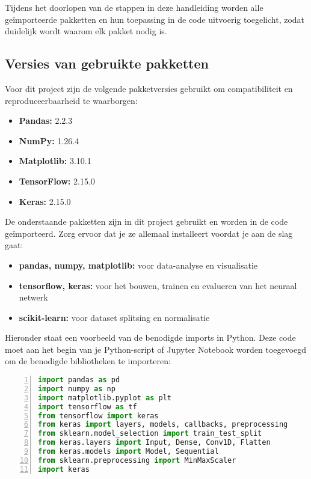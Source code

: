 Tijdens het doorlopen van de stappen in deze handleiding worden alle geïmporteerde pakketten en hun toepassing in de code uitvoerig toegelicht, zodat duidelijk wordt waarom elk pakket nodig is.
\subsection*{Versies van gebruikte pakketten}
Voor dit project zijn de volgende pakketversies gebruikt om compatibiliteit en reproduceerbaarheid te waarborgen:
\begin{itemize}
  \item \textbf{Pandas:} 2.2.3
  \item \textbf{NumPy:} 1.26.4
  \item \textbf{Matplotlib:} 3.10.1
  \item \textbf{TensorFlow:} 2.15.0
  \item \textbf{Keras:} 2.15.0
\end{itemize}

De onderstaande pakketten zijn in dit project gebruikt en worden in de code geïmporteerd. Zorg ervoor dat je ze allemaal installeert voordat je aan de slag gaat:
\begin{itemize}
  \item \textbf{pandas, numpy, matplotlib:} voor data-analyse en visualisatie
  \item \textbf{tensorflow, keras:} voor het bouwen, trainen en evalueren van het neuraal netwerk
  \item \textbf{scikit-learn:} voor dataset splitsing en normalisatie
\end{itemize}
Hieronder staat een voorbeeld van de benodigde imports in Python. Deze code moet aan het begin van je Python-script of Jupyter Notebook worden toegevoegd om de benodigde bibliotheken te importeren:
\begin{lstlisting}[language=Python, numbers=left, breaklines=true, basicstyle=\ttfamily\scriptsize]
import pandas as pd
import numpy as np
import matplotlib.pyplot as plt
import tensorflow as tf
from tensorflow import keras
from keras import layers, models, callbacks, preprocessing
from sklearn.model_selection import train_test_split 
from keras.layers import Input, Dense, Conv1D, Flatten
from keras.models import Model, Sequential
from sklearn.preprocessing import MinMaxScaler
import keras
\end{lstlisting}
